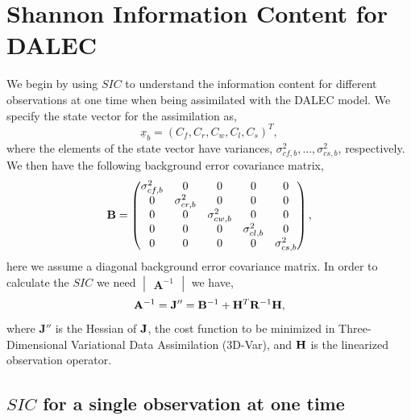 \documentclass[11pt]{article}
\begin{document}
\section{Shannon Information Content for DALEC}

We begin by using $SIC$ to understand the information content for different observations at one time when being assimilated with the DALEC model. We specify the state vector for the assimilation as,
\[ \underline{x}_b = (C_f, C_r, C_w, C_l, C_s)^T, \] 
where the elements of the state vector have variances, $\sigma_{cf,b}^{2},\ldots,\sigma_{cs,b}^{2}$, respectively. We then have the following background error covariance matrix,
\[
\bf{B} = \begin{pmatrix} 
\sigma_{cf,b}^{2} & 0 & 0 & 0 & 0 \\
0 & \sigma_{cr,b}^{2} & 0 & 0 & 0 \\
0 & 0 & \sigma_{cw,b}^{2} & 0 & 0 \\
0 & 0 & 0 & \sigma_{cl,b}^{2} & 0 \\
0 & 0 & 0 & 0 & \sigma_{cs,b}^{2} \\
\end{pmatrix},
\]  
here we assume a diagonal background error covariance matrix. In order to calculate the $SIC$ we need $\begin{vmatrix} \mathbf{A}^{-1} \end{vmatrix}$ we have,
\[
\mathbf{A}^{-1}=\mathbf{J}'' = \mathbf{B}^{-1}+\mathbf{H}^{T}\mathbf{R}^{-1}\bf{H}, 
\]
where $\mathbf{J}''$ is the Hessian of $\bf{J}$, the cost function to be minimized in Three-Dimensional Variational Data Assimilation (3D-Var), and $\bf{H}$ is the linearized observation operator. 

\subsection{$SIC$ for a single observation at one time}
\end{document}
